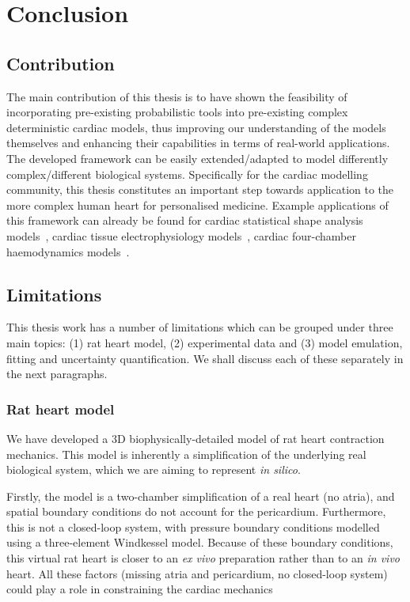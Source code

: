 \chapter{Conclusion}\label{cha:chapter9}
%
%
%
\section{Contribution}\label{sec:ch9contribution}
The main contribution of this thesis is to have shown the feasibility of incorporating pre-existing probabilistic tools into pre-existing complex deterministic cardiac models, thus improving our understanding of the models themselves and enhancing their capabilities in terms of real-world applications. The developed framework can be easily extended/adapted to model differently complex/different biological systems. Specifically for the cardiac modelling community, this thesis constitutes an important step towards application to the more complex human heart for personalised medicine. Example applications of this framework can already be found for cardiac statistical shape analysis models~\cite{Rodero:2021}, cardiac tissue electrophysiology models~\cite{Fassina:2020}, cardiac four-chamber haemodynamics models~\cite{Karabelas:2021}.


%
%
%
\section{Limitations}\label{sec:ch9limitations}
This thesis work has a number of limitations which can be grouped under three main topics: (1) rat heart model, (2) experimental data and (3) model emulation, fitting and uncertainty quantification. We shall discuss each of these separately in the next paragraphs.


%
%
%
\subsection{Rat heart model}\label{sec:ch9rat_heart_model}
We have developed a $3$D biophysically-detailed model of rat heart contraction mechanics. This model is inherently a simplification of the underlying real biological system, which we are aiming to represent \textit{in silico}.

\vspace{0.2cm}
Firstly, the model is a two-chamber simplification of a real heart (no atria), and spatial boundary conditions do not account for the pericardium. Furthermore, this is not a closed-loop system, with pressure boundary conditions modelled using a three-element Windkessel model. Because of these boundary conditions, this virtual rat heart is closer to an \textit{ex vivo} preparation rather than to an \textit{in vivo} heart. All these factors (missing atria and pericardium, no closed-loop system) could play a role in constraining the cardiac mechanics~\cite{Strocchi:2020,Augustin:2021}

